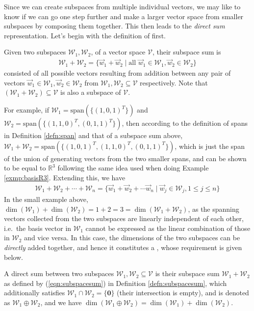 Since we can create subspaces from multiple individual vectors, we may like to know if we can go one step further and make a larger vector space from smaller subspaces by composing them together. This then leads to the \textit{direct sum} representation. Let's begin with the definition of  first.
\begin{defn}
\label{defn:subspacesum}
Given two subspaces $\mathcal{W}_1, \mathcal{W}_2$, of a vector space $\mathcal{V}$, their subspace sum is
\begin{align}
\mathcal{W}_1 + \mathcal{W}_2 = \{\vec{w}_1 + \vec{w}_2 \mid \text{all } \vec{w}_1 \in \mathcal{W}_1, \vec{w}_2 \in \mathcal{W}_2\}  \label{eqn:subspacesum}
\end{align}
consisted of all possible vectors resulting from addition between any pair of vectors $\vec{w}_1 \in \mathcal{W}_1, \vec{w}_2 \in \mathcal{W}_2$ from $\mathcal{W}_1, \mathcal{W}_2 \subseteq \mathcal{V}$ respectively. Note that $(\mathcal{W}_1 + \mathcal{W}_2) \subseteq \mathcal{V}$ is also a subspace of $\mathcal{V}$.
\end{defn}
For example, if $\mathcal{W}_1 = \text{span}(\{(1,0,1)^T\})$ and $\mathcal{W}_2 = \text{span}(\{(1,1,0)^T, (0,1,1)^T\})$, then according to the definition of spans in Definition \ref{defn:span} and that of a subspace sum above, $\mathcal{W}_1 + \mathcal{W}_2 = \text{span}(\{(1,0,1)^T, (1,1,0)^T, (0,1,1)^T\})$, which is just the span of the union of generating vectors from the two smaller spans, and can be shown to be equal to $\mathbb{R}^3$ following the same idea used when doing Example \ref{exmp:basisR3}. Extending this, we have
\begin{align}
\mathcal{W}_1 + \mathcal{W}_2 + \cdots + \mathcal{W}_n = \{\vec{w}_1 + \vec{w}_2 + \cdots \vec{w}_n \mid \vec{w}_j \in \mathcal{W}_j, 1 \leq j \leq n\}    
\end{align}
In the small example above, $\dim(\mathcal{W}_1) + \dim(\mathcal{W}_2) = 1 + 2 = 3 = \dim(\mathcal{W}_1 + \mathcal{W}_2)$, as the spanning vectors collected from the two subspaces are linearly independent of each other, i.e.\ the basis vector in $\mathcal{W}_1$ cannot be expressed as the linear combination of those in $\mathcal{W}_2$ and vice versa. In this case, the dimensions of the two subspaces can be \textit{directly} added together, and hence it constitutes a , whose requirement is given below.
\begin{defn}
\label{defn:directsum}
A direct sum between two subspaces $\mathcal{W}_1, \mathcal{W}_2 \subseteq \mathcal{V}$ is their subspace sum $\mathcal{W}_1 + \mathcal{W}_2$ as defined by (\ref{eqn:subspacesum}) in Definition \ref{defn:subspacesum}, which additionally satisfies $\mathcal{W}_1 \cap \mathcal{W}_2 = \{\textbf{0}\}$ (their intersection is empty), and is denoted as $\mathcal{W}_1 \oplus \mathcal{W}_2$, and we have $\dim(\mathcal{W}_1 \oplus \mathcal{W}_2) = \dim(\mathcal{W}_1) + \dim(\mathcal{W}_2)$.
\end{defn}
